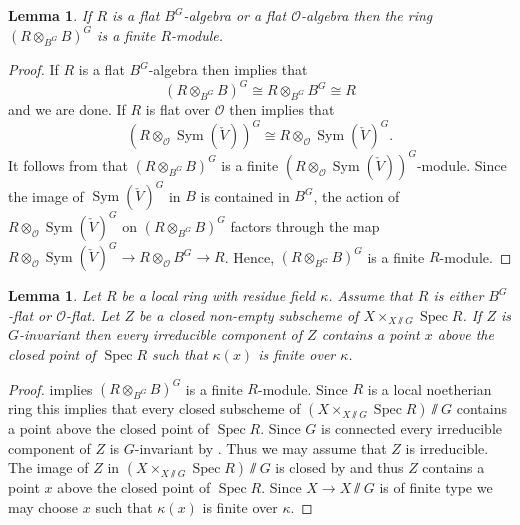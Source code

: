 \documentclass{amsart}
\newtheorem{lem}[prop]{Lemma}
\theoremstyle{definition}
\theoremstyle{remark}
\DeclareMathOperator{\Sym}{Sym}
\DeclareMathOperator{\Spec}{Spec}
\newcommand{\OO}{\mathcal O}
\begin{document}
\begin{lem}\label{finite} If $R$ is a flat $B^G$-algebra or a flat $\OO$-algebra then the ring $(R\otimes_{B^G} B)^G$ is a finite $R$-module. 
\end{lem} 
\begin{proof} If $R$ is a flat $B^G$-algebra then \cite[Lemma 2]{seshadri} implies that 
\begin{equation}
(R\otimes_{B^G} B)^G \cong R \otimes_{B^G} B^G \cong R
\end{equation}
and we are done. 
If $R$ is flat over $\OO$ then \cite[Lemma 2]{seshadri} implies that 
\begin{equation}
(R\otimes_{\OO} \Sym(\check V))^G\cong 
R\otimes_{\OO} \Sym(\check V)^G.
\end{equation}
It follows from 
\cite[Theorem 2 (ii)]{seshadri} that 
$(R\otimes_{B^G} B)^G$ is a finite 
$(R\otimes_{\OO} \Sym(\check V))^G$-module. 
Since the image of $\Sym(\check V)^G$ in $B$ 
is contained in $B^G$, the action of 
$R\otimes_{\OO} \Sym(\check V)^G$ on $(R\otimes_{B^G} B)^G$ factors through the 
map $R\otimes_{\OO} \Sym(\check V)^G\rightarrow R\otimes_{\OO} B^G \rightarrow R$. Hence, 
$(R\otimes_{B^G} B)^G$ is a finite $R$-module.
\end{proof}

\begin{lem}\label{finite2} Let $R$ be a local ring with residue field $\kappa$. Assume that $R$  is either $B^G$-flat or $\OO$-flat. Let $Z$ be a closed non-empty  subscheme of $X\times_{X\sslash G} \Spec R$. If $Z$ is $G$-invariant then every irreducible component 
of $Z$ contains a point $x$ above the closed point of $\Spec R$ such that $\kappa(x)$
is finite over $\kappa$.
\end{lem} 
\begin{proof}  implies $(R\otimes_{B^G} B)^G$ is a finite $R$-module. 
Since $R$ is a local noetherian ring this implies that every closed subscheme of 
$(X\times_{X\sslash G} \Spec R)\sslash G$ 
contains a point above the closed point of $\Spec R$. 
Since $G$ is connected every irreducible component 
of $Z$ is $G$-invariant by \cite[Lemma 2.1]{BIP_new}. Thus we may assume that $Z$ is irreducible. The image of $Z$ 
in $(X\times_{X\sslash G} \Spec R)\sslash G$
is closed by \cite[Theorem 3 (iii)]{seshadri} and thus $Z$ contains a point
$x$ above the closed point of $\Spec R$. Since $X\rightarrow X\sslash G$ is 
of finite type we may choose $x$ such that $\kappa(x)$ is finite over $\kappa$.
\end{proof} 
\end{document}

